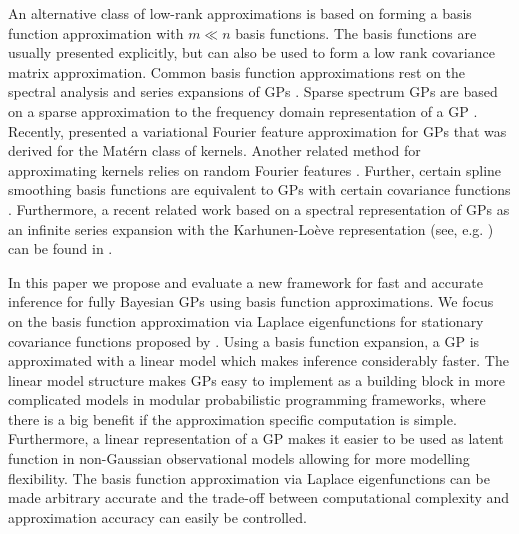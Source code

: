 \documentclass[onecolumn,a4paper,11pt]{article}
\begin{document}
An alternative class of low-rank approximations is based on forming a basis function approximation with $m \ll n$ basis functions. The basis functions are usually presented explicitly, but can also be used to form a low rank covariance matrix approximation. Common basis function approximations rest on the spectral analysis and series expansions of GPs \citep{loeve1977probability,trees1968detection,adler1981geometry,cramer2013stationary}.
Sparse spectrum GPs are based on a sparse approximation to the frequency domain representation of a GP \citep{lazaro2010sparse,quia2010sparse,gal2015improving}. Recently, \cite{hensman2017variational} presented a variational Fourier feature approximation for GPs that was derived for the Mat{\'e}rn class of kernels. Another related method for approximating kernels relies on random Fourier features \citep{rahimi2008random,rahimi2009weighted}.
Further, certain spline smoothing basis functions are equivalent to GPs with certain covariance functions \citep{wahba1990spline,Furrer+Nychka:2007}.
Furthermore, a recent related work based on a spectral representation of GPs as an infinite series expansion with the Karhunen-Loève representation (see, e.g. \cite{grenander1981abstract}) can be found in \cite{JSSv090i10}.


In this paper we propose and evaluate a new framework for fast and accurate inference for fully Bayesian GPs using basis function approximations. We focus on the basis function approximation via Laplace eigenfunctions for stationary covariance functions proposed by \citet{solin2018hilbert}. Using a basis function expansion, a GP is approximated with a linear model which makes inference considerably faster. The linear model structure makes GPs easy to implement as a building block in more complicated models in modular probabilistic programming frameworks, where there is a big benefit if the approximation specific computation is simple. Furthermore, a linear representation of a GP makes it easier to be used as latent function
in non-Gaussian observational models allowing for more modelling flexibility. The basis function approximation via Laplace eigenfunctions can be made arbitrary accurate and the trade-off between computational complexity and approximation accuracy can easily be controlled.
\end{document}
